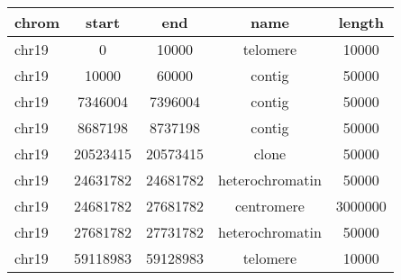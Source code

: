 \documentclass{standalone}
\begin{document}
\begin{tabular}{|l|c|c|c|c|}
\toprule
chrom & start & end & name & length \\
\midrule
chr19 & 0 & 10000 & telomere & 10000 \\
chr19 & 10000 & 60000 & contig & 50000 \\
chr19 & 7346004 & 7396004 & contig & 50000 \\
chr19 & 8687198 & 8737198 & contig & 50000 \\
chr19 & 20523415 & 20573415 & clone & 50000 \\
chr19 & 24631782 & 24681782 & heterochromatin & 50000 \\
chr19 & 24681782 & 27681782 & centromere & 3000000 \\
chr19 & 27681782 & 27731782 & heterochromatin & 50000 \\
chr19 & 59118983 & 59128983 & telomere & 10000 \\
\bottomrule
\end{tabular}
\end{document}
